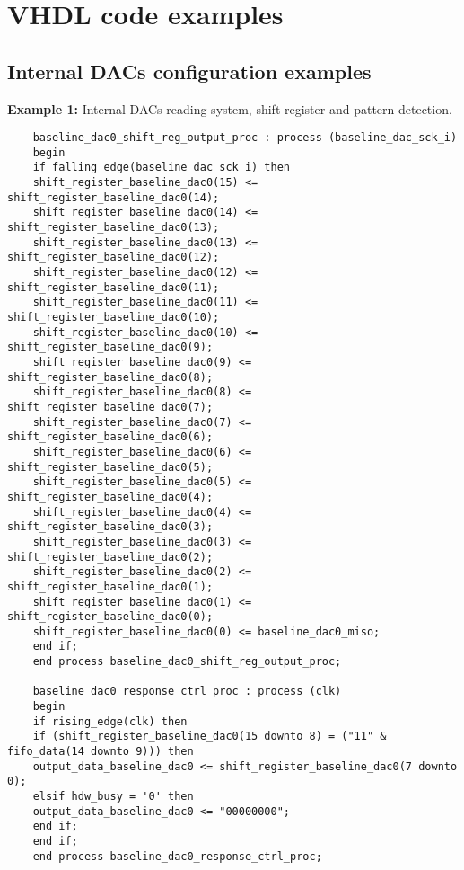 \chapter{VHDL code examples}\label{codeexamples}
\section{Internal DACs configuration examples}
\noindent \textbf{Example 1:} Internal DACs reading system, shift register and pattern detection. 
\begin{verbatim}
	baseline_dac0_shift_reg_output_proc : process (baseline_dac_sck_i)
	begin
	if falling_edge(baseline_dac_sck_i) then 
	shift_register_baseline_dac0(15) <= shift_register_baseline_dac0(14);
	shift_register_baseline_dac0(14) <= shift_register_baseline_dac0(13);
	shift_register_baseline_dac0(13) <= shift_register_baseline_dac0(12);
	shift_register_baseline_dac0(12) <= shift_register_baseline_dac0(11);
	shift_register_baseline_dac0(11) <= shift_register_baseline_dac0(10);
	shift_register_baseline_dac0(10) <= shift_register_baseline_dac0(9);
	shift_register_baseline_dac0(9) <= shift_register_baseline_dac0(8);
	shift_register_baseline_dac0(8) <= shift_register_baseline_dac0(7);
	shift_register_baseline_dac0(7) <= shift_register_baseline_dac0(6);
	shift_register_baseline_dac0(6) <= shift_register_baseline_dac0(5);
	shift_register_baseline_dac0(5) <= shift_register_baseline_dac0(4);
	shift_register_baseline_dac0(4) <= shift_register_baseline_dac0(3);
	shift_register_baseline_dac0(3) <= shift_register_baseline_dac0(2);
	shift_register_baseline_dac0(2) <= shift_register_baseline_dac0(1);
	shift_register_baseline_dac0(1) <= shift_register_baseline_dac0(0);
	shift_register_baseline_dac0(0) <= baseline_dac0_miso;
	end if;
	end process baseline_dac0_shift_reg_output_proc;
	
	baseline_dac0_response_ctrl_proc : process (clk)
	begin
	if rising_edge(clk) then 
	if (shift_register_baseline_dac0(15 downto 8) = ("11" & fifo_data(14 downto 9))) then
	output_data_baseline_dac0 <= shift_register_baseline_dac0(7 downto 0);
	elsif hdw_busy = '0' then	
	output_data_baseline_dac0 <= "00000000";
	end if;
	end if;
	end process baseline_dac0_response_ctrl_proc;
\end{verbatim}
\newpage
